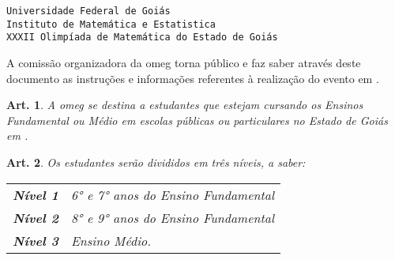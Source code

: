 \documentclass[a4paper,12pt]{article}
\newtheorem{article}{Art.}
\begin{document}
\begin{center}
  \texttt{Universidade Federal de Goiás}                    \\
  \texttt{Instituto de Matemática e Estatistica}            \\
  \texttt{XXXII Olimpíada de Matemática do Estado de Goiás}
\end{center}

\vspace{24pt}

A comissão organizadora da \currentEdition{} \acrfull{omeg} torna público e faz
saber através deste documento as instruções e informações referentes à
realização do evento em \year.

\vspace{24pt}

\begin{article}
  A \acrshort{omeg} se destina a estudantes que estejam cursando os Ensinos
  Fundamental ou Médio em escolas públicas ou particulares no Estado de Goiás
  em \year.
\end{article}

\begin{article}
  Os estudantes serão divididos em três níveis, a saber:
  \begin{table}[H]
    \centering
    \begin{tabular}{ll}
      \textbf{Nível 1} & 6° e 7° anos do Ensino Fundamental \\
      \textbf{Nível 2} & 8° e 9° anos do Ensino Fundamental \\
      \textbf{Nível 3} & Ensino Médio.
    \end{tabular}
  \end{table}
\end{article}

\end{document}
